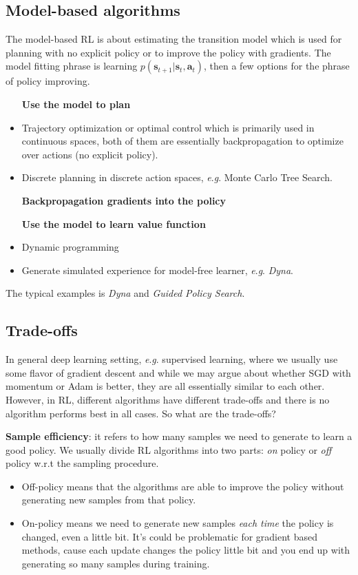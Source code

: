 \documentclass{tufte-handout}
\newcommand{\eg}{\textit{e}.\textit{g}. }
\newcommand{\s}{\mathbf{s}}
\newcommand{\act}{\mathbf{a}}
\begin{document}
\subsection{Model-based algorithms}
The model-based RL is about estimating the transition model which is used for planning with no explicit policy or to improve the policy with gradients. The model fitting phrase is learning $p(\s_{t+1} | \s_t, \act_t) $, then a few options for the phrase of policy improving.
\begin{itemize}
  \item [\textbf{Use the model to plan}]
  \item Trajectory optimization or optimal control which is primarily used in continuous spaces, both of them are essentially backpropagation to optimize over actions (no explicit policy).
  \item Discrete planning in discrete action spaces, \eg Monte Carlo Tree Search.

  \item [\textbf{Backpropagation gradients into the policy}]
  \item [\textbf{Use the model to learn value function}]
  \item Dynamic programming
  \item Generate simulated experience for model-free learner, \eg \emph{Dyna}.
\end{itemize}

The typical examples is \emph{Dyna} and \emph{Guided Policy Search}.

\subsection{Trade-offs}
In general deep learning setting, \eg supervised learning, where we usually use some flavor of gradient descent and while we may argue about whether SGD with momentum or Adam is better, they are all essentially similar to each other. However, in RL, different algorithms have different trade-offs and there is no algorithm performs best in all cases. So what are the trade-offs?

\textbf{Sample efficiency}: it refers to how many samples we need to generate to learn a good policy. We usually divide RL algorithms into two parts: \emph{on} policy or \emph{off} policy w.r.t the sampling procedure.
\begin{itemize}
  \item Off-policy means that the algorithms are able to improve the policy without generating new samples from that policy.
  \item On-policy means we need to generate new samples \emph{each time} the policy is changed, even a little bit. It's could be problematic for gradient based methods, cause each update changes the policy little bit and you end up with generating so many samples during training.
\end{itemize}
\end{document}
